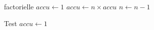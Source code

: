 \begin{algo}{factorielle}
\Constant{$\emptyset$}
\Global{$\emptyset$}
\Local{$\emptyset$}
\BlankLine
  $accu \leftarrow 1$ \;
   {
    $accu \leftarrow n \times accu$ \;
    $n \leftarrow n - 1$ 
  }
\end{algo}

\begin{algo}{Test}
\Global{$\emptyset$}
\Local{$\emptyset$}
\BlankLine
  $accu \leftarrow 1$ \;

\end{algo}


